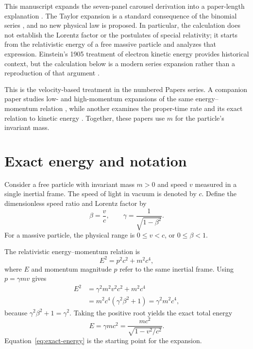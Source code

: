 \documentclass[12pt]{article}
\begin{document}
This manuscript expands the seven-panel carousel derivation into a paper-length explanation \cite{carousel}. The Taylor expansion is a standard consequence of the binomial series \cite{DLMF}, and no new physical law is proposed. In particular, the calculation does not establish the Lorentz factor or the postulates of special relativity; it starts from the relativistic energy of a free massive particle and analyzes that expression. Einstein's 1905 treatment of electron kinetic energy provides historical context, but the calculation below is a modern series expansion rather than a reproduction of that argument \cite{Einstein1905}.

This is the velocity-based treatment in the numbered Papers series. A companion paper studies low- and high-momentum expansions of the same energy--momentum relation \cite{EnergyMomentum}, while another examines the proper-time rate and its exact relation to kinetic energy \cite{ProperTime}. Together, these papers use $m$ for the particle's invariant mass.

\section{Exact energy and notation}

Consider a free particle with invariant mass $m>0$ and speed $v$ measured in a single inertial frame. The speed of light in vacuum is denoted by $c$. Define the dimensionless speed ratio and Lorentz factor by
\begin{equation}
  \beta=\frac{v}{c},
  \qquad
  \gamma=\frac{1}{\sqrt{1-\beta^2}}.
  \label{eq:velocity-lorentz-factor}
\end{equation}
For a massive particle, the physical range is $0\leq v<c$, or $0\leq\beta<1$.

The relativistic energy--momentum relation is
\begin{equation}
  E^2=p^2c^2+m^2c^4,
  \label{eq:energy-momentum-relation}
\end{equation}
where $E$ and momentum magnitude $p$ refer to the same inertial frame. Using $p=\gamma mv$ gives
\begin{align}
  E^2
  &=\gamma^2m^2v^2c^2+m^2c^4 \label{eq:energy-momentum-substitution} \\
  &=m^2c^4\left(\gamma^2\beta^2+1\right) \label{eq:energy-momentum-simplification}
   =\gamma^2m^2c^4,
\end{align}
because $\gamma^2\beta^2+1=\gamma^2$. Taking the positive root yields the exact total energy
\begin{equation}
  E=\gamma mc^2
   =\frac{mc^2}{\sqrt{1-v^2/c^2}}.
  \label{eq:exact-energy}
\end{equation}
Equation~\eqref{eq:exact-energy} is the starting point for the expansion.
\end{document}
